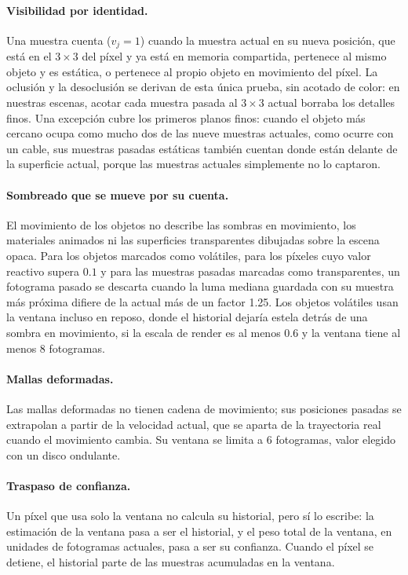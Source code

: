 \documentclass[11pt,a4paper]{article}
\begin{document}
\paragraph{Visibilidad por identidad.} Una muestra cuenta ($v_j=1$) cuando la muestra actual en su nueva posición, que está en el $3\times3$ del píxel y ya está en memoria compartida, pertenece al mismo objeto y es estática, o pertenece al propio objeto en movimiento del píxel. La oclusión y la desoclusión se derivan de esta única prueba, sin acotado de color: en nuestras escenas, acotar cada muestra pasada al $3\times3$ actual borraba los detalles finos. Una excepción cubre los primeros planos finos: cuando el objeto más cercano ocupa como mucho dos de las nueve muestras actuales, como ocurre con un cable, sus muestras pasadas estáticas también cuentan donde están delante de la superficie actual, porque las muestras actuales simplemente no lo captaron.

\paragraph{Sombreado que se mueve por su cuenta.} El movimiento de los objetos no describe las sombras en movimiento, los materiales animados ni las superficies transparentes dibujadas sobre la escena opaca. Para los objetos marcados como volátiles, para los píxeles cuyo valor reactivo supera $0.1$ y para las muestras pasadas marcadas como transparentes, un fotograma pasado se descarta cuando la luma mediana guardada con su muestra más próxima difiere de la actual más de un factor 1.25. Los objetos volátiles usan la ventana incluso en reposo, donde el historial dejaría estela detrás de una sombra en movimiento, si la escala de render es al menos 0.6 y la ventana tiene al menos 8 fotogramas.

\paragraph{Mallas deformadas.} Las mallas deformadas no tienen cadena de movimiento; sus posiciones pasadas se extrapolan a partir de la velocidad actual, que se aparta de la trayectoria real cuando el movimiento cambia. Su ventana se limita a 6 fotogramas, valor elegido con un disco ondulante.

\paragraph{Traspaso de confianza.} Un píxel que usa solo la ventana no calcula su historial, pero sí lo escribe: la estimación de la ventana pasa a ser el historial, y el peso total de la ventana, en unidades de fotogramas actuales, pasa a ser su confianza. Cuando el píxel se detiene, el historial parte de las muestras acumuladas en la ventana.
\end{document}
